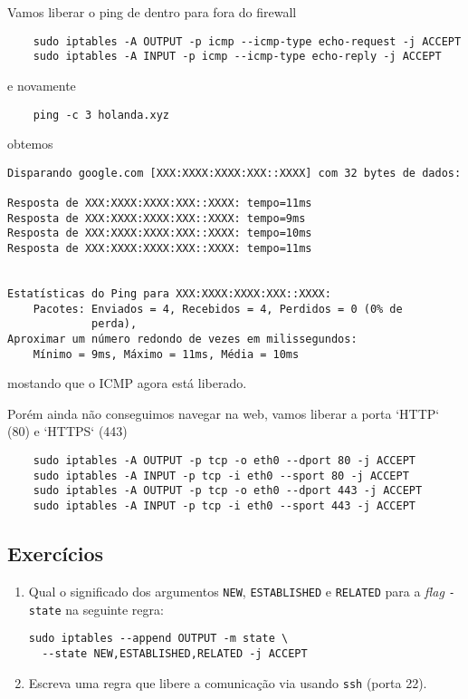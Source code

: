 Vamos liberar o ping de dentro para fora do firewall


\begin{lstlisting}
    sudo iptables -A OUTPUT -p icmp --icmp-type echo-request -j ACCEPT
    sudo iptables -A INPUT -p icmp --icmp-type echo-reply -j ACCEPT
\end{lstlisting}

\noindent e novamente

\begin{lstlisting}
    ping -c 3 holanda.xyz
\end{lstlisting}

\noindent obtemos


\begin{lstlisting}
Disparando google.com [XXX:XXXX:XXXX:XXX::XXXX] com 32 bytes de dados:
   
Resposta de XXX:XXXX:XXXX:XXX::XXXX: tempo=11ms 
Resposta de XXX:XXXX:XXXX:XXX::XXXX: tempo=9ms 
Resposta de XXX:XXXX:XXXX:XXX::XXXX: tempo=10ms 
Resposta de XXX:XXXX:XXXX:XXX::XXXX: tempo=11ms 


Estatísticas do Ping para XXX:XXXX:XXXX:XXX::XXXX:
    Pacotes: Enviados = 4, Recebidos = 4, Perdidos = 0 (0% de
             perda),
Aproximar um número redondo de vezes em milissegundos:
    Mínimo = 9ms, Máximo = 11ms, Média = 10ms
\end{lstlisting}

\noindent mostando que o ICMP agora está liberado.


Porém ainda não conseguimos navegar na web, vamos liberar a porta `HTTP` (80) 
 e `HTTPS` (443)


\begin{lstlisting}
    sudo iptables -A OUTPUT -p tcp -o eth0 --dport 80 -j ACCEPT
    sudo iptables -A INPUT -p tcp -i eth0 --sport 80 -j ACCEPT
    sudo iptables -A OUTPUT -p tcp -o eth0 --dport 443 -j ACCEPT
    sudo iptables -A INPUT -p tcp -i eth0 --sport 443 -j ACCEPT
\end{lstlisting}

\subsection*{Exercícios}
\begin{enumerate}
\item Qual o significado dos argumentos {\tt NEW}, {\tt ESTABLISHED} e
{\tt RELATED} para a {\em flag} {\tt -state} na seguinte regra:

\begin{lstlisting}
sudo iptables --append OUTPUT -m state \
  --state NEW,ESTABLISHED,RELATED -j ACCEPT
\end{lstlisting}

\item Escreva uma regra que libere a comunicação via usando {\tt ssh} (porta 22).
\end{enumerate}
